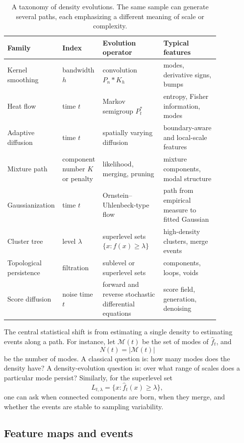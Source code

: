 \documentclass[preprint]{imsart}
\theoremstyle{plain}
\theoremstyle{definition}
\newcommand{\fhat}{\widehat f}
\newcommand{\calM}{\mathcal{M}}
\begin{document}
\begin{table}[t]
\centering
\caption{A taxonomy of density evolutions. The same sample can generate several paths, each emphasizing a different meaning of scale or complexity.}
\label{tab:evolution-taxonomy}
\begin{tabular}{p{0.17\linewidth}p{0.15\linewidth}p{0.28\linewidth}p{0.26\linewidth}}
\hline
Family & Index & Evolution operator & Typical features \\
\hline
Kernel smoothing
& bandwidth $h$
& convolution $\widehat P_n * K_h$
& modes, derivative signs, bumps \\
Heat flow
& time $t$
& Markov semigroup $P_t^*$
& entropy, Fisher information, modes \\
Adaptive diffusion
& time $t$
& spatially varying diffusion
& boundary-aware and local-scale features \\
Mixture path
& component number $K$ or penalty
& likelihood, merging, pruning
& mixture components, modal structure \\
Gaussianization
& time $t$
& Ornstein--Uhlenbeck-type flow
& path from empirical measure to fitted Gaussian \\
Cluster tree
& level $\lambda$
& superlevel sets $\{x:f(x)\ge\lambda\}$
& high-density clusters, merge events \\
Topological persistence
& filtration
& sublevel or superlevel sets
& components, loops, voids \\
Score diffusion
& noise time $t$
& forward and reverse stochastic differential equations
& score field, generation, denoising \\
\hline
\end{tabular}
\end{table}

The central statistical shift is from estimating a single density to estimating events along a path. For instance, let $\calM(t)$ be the set of modes of $\fhat_t$, and
\[
  N(t)=|\calM(t)|
\]
be the number of modes. A classical question is: how many modes does the density have? A density-evolution question is: over what range of scales does a particular mode persist? Similarly, for the superlevel set
\[
  L_{t,\lambda}=\{x:\fhat_t(x)\ge \lambda\},
\]
one can ask when connected components are born, when they merge, and whether the events are stable to sampling variability.

\subsection{Feature maps and events}
\label{subsec:feature-maps}
\end{document}

